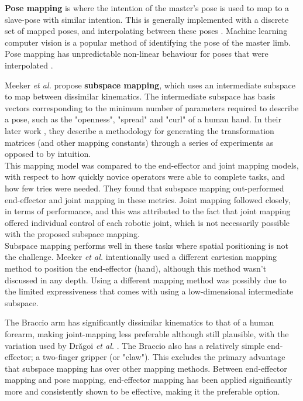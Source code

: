 \textbf{Pose mapping} is where the intention of the master's pose is used to map to a slave-pose with similar intention. This is generally implemented with a discrete set of mapped poses, and interpolating between these poses \cite{bib:gesture_recognition}. Machine learning computer vision is a popular method of identifying the pose of the master limb. Pose mapping has unpredictable non-linear behaviour for poses that were interpolated \cite{bib:teleoperation_survey}\cite{bib:teleoperation_continuous_space}.

Meeker \textit{et al.} \cite{bib:teleoperation_continuous_space}\cite{bib:teleoperation_continuous_space_2} propose \textbf{subspace mapping}, which uses an intermediate subspace to map between dissimilar kinematics. The intermediate subspace has basis vectors corresponding to the minimum number of parameters required to describe a pose, such as the "openness", "spread" and "curl" of a human hand. In their later work \cite{bib:teleoperation_continuous_space_2}, they describe a methodology for generating the transformation matrices (and other mapping constants) through a series of experiments as opposed to by intuition.\\
This mapping model was compared to the end-effector and joint mapping models, with respect to how quickly novice operators were able to complete tasks, and how few tries were needed. They found that subspace mapping out-performed end-effector and joint mapping in these metrics. Joint mapping followed closely, in terms of performance, and this was attributed to the fact that joint mapping offered individual control of each robotic joint, which is not necessarily possible with the proposed subspace mapping.\\
Subspace mapping performs well in these tasks where spatial positioning is not the challenge. Meeker \textit{et al.} intentionally used a different cartesian mapping method to position the end-effector (hand), although this method wasn't discussed in any depth. Using a different mapping method was possibly due to the limited expressiveness that comes with using a low-dimensional intermediate subspace.

\newpage
The Braccio arm has significantly dissimilar kinematics to that of a human forearm, making joint-mapping less preferable although still plausible, with the variation used by Drăgoi \textit{et al.} \cite{bib:teleoperation_intuitive_using_MediaPipeHands}. The Braccio also has a relatively simple end-effector; a two-finger gripper (or "claw"). This excludes the primary advantage that subspace mapping has over other mapping methods. Between end-effector mapping and pose mapping, end-effector mapping has been applied significantly more and consistently shown to be effective, making it the preferable option.


